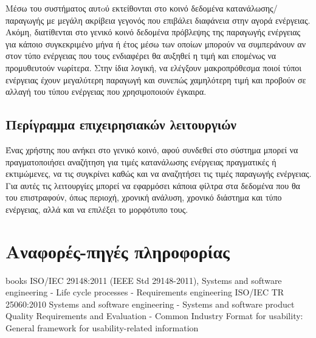 \documentclass[a4paper,12pt, oneside]{article}
\begin{document}
Μέσω του συστήματος αυτoύ εκτείθονται στο κοινό δεδομένα κατανάλωσης/παραγωγής με μεγάλη ακρίβεια γεγονός που επιβάλει διαφάνεια στην αγορά ενέργειας. Ακόμη, διατίθενται στο γενικό κοινό δεδομένα πρόβλεψης της παραγωγής ενέργειας για κάποιο συγκεκριμένο μήνα ή έτος μέσω των οποίων μπορούν να συμπεράνουν αν στον τύπο ενέργειας που τους ενδιαφέρει θα αυξηθεί η τιμή και επομένως να προμυθευτούν νωρίτερα. Στην ίδια λογική, να ελέγξουν μακροπρόθεσμα ποιοί τύποι ενέργειας έχουν μεγαλύτερη παραγωγή και συνεπώς χαμηλότερη τιμή και προβούν σε αλλαγή του τύπου ενέργειας που χρησιμοποιούν έγκαιρα. 

\subsection{Περίγραμμα επιχειρησιακών λειτουργιών}
Ένας χρήστης που ανήκει στο γενικό κοινό, αφού συνδεθεί στο σύστημα μπορεί να πραγματοποιήσει αναζήτηση για τιμές κατανάλωσης ενέργειας πραγματικές ή εκτιμώμενες, να τις συγκρίνει καθώς και να αναζητήσει τις τιμές παραγωγής ενέργειας. Για αυτές τις λειτουργίες μπορεί να εφαρμόσει κάποια φίλτρα στα δεδομένα που θα του επιστραφούν, όπως περιοχή, χρονική ανάλυση, χρονικό διάστημα και τύπο ενέργειας, αλλά και να  επιλέξει το μορφότυπο τους.

\newpage
\section{Αναφορές-πηγές πληροφορίας}
\begingroup
\renewcommand{\section}{\subsection}
\begin{thebibliography} {books}
\latintext
{} ISO/IEC 29148:2011 (IEEE Std 29148-2011), Systems and software engineering - Life cycle processes - Requirements engineering
 ISO/IEC TR 25060:2010  Systems and software engineering - Systems and software product Quality Requirements and Evaluation - Common Industry Format for usability: General framework for usability-related information
\end{thebibliography}
\endgroup
\end{document}

